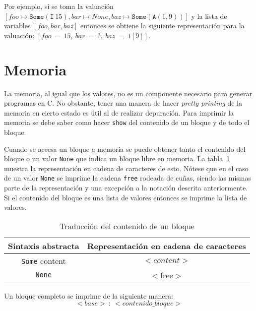 \begin{equation*}
[<vname_0> = <valor_0>, <vname_1> = <valor_1>, \dots, <vname_n> = <valor_n>]
\end{equation*}

Por ejemplo, si se toma la valuación $[foo \mapsto \mathtt{Some}(\mathtt{I}\ 15), bar \mapsto None, baz \mapsto \mathtt{Some}(\mathtt{A}(1,9))]$ y la lista de variables $[foo, bar, baz]$ entonces se obtiene la siguiente representación para la valuación: $[foo\ =\ 15,\ bar\ =\ ?,\ baz\ =\ 1[9]]$.

\section{Memoria}\label{section:pretty_memory}

La memoria, al igual que los valores, no es un componente necesario para generar programas en C.
No obstante, tener una manera de hacer \textit{pretty printing} de la memoria en cierto estado es útil al de realizar depuración.
Para imprimir la memoria se debe saber como hacer \verb|show| del contenido de un bloque y de todo el bloque.

Cuando se accesa un bloque a memoria se puede obtener tanto el contenido del bloque o un valor \verb|None| que indica un bloque libre en memoria.
La tabla~\ref{tab:pretty_block_content} muestra la representación en cadena de caracteres de esto.
Nótese que en el caso de un valor \verb|None| se imprime la cadena \verb|free| rodeada de cuñas, siendo las mismas parte de la representación y una excepción a la notación descrita anteriormente.
Si el contenido del bloque es una lista de valores entonces se imprime la lista de valores.

\begin{table}[h!]
\centering
\begin{tabular}{|c|c|}
  \hline
  \textbf{Sintaxis abstracta} & \textbf{Representación en cadena de caracteres} \\ [0.5ex]
  \hline \hline
  \verb|Some| content & $<content>$ \\
  \verb|None| & $<$free$>$ \\
  \hline
\end{tabular}

\caption{Traducción del contenido de un bloque}
\label{tab:pretty_block_content}
\end{table}

Un bloque completo se imprime de la siguiente manera:
\begin{equation*}
<base>\ :\ <contenido\_bloque> 
\end{equation*}

